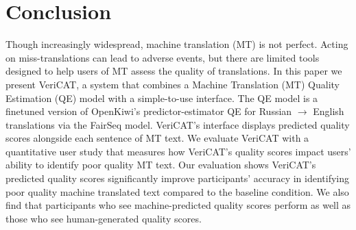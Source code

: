 \section{Conclusion}

Though increasingly widespread, machine translation (MT) is not perfect. Acting on miss-translations can lead to adverse events, but there are limited tools designed to help users of MT assess the quality of translations. In this paper we present VeriCAT, a system %
that combines a Machine Translation (MT) Quality Estimation (QE) model with a simple-to-use interface. The QE model is a finetuned version of OpenKiwi's predictor-estimator QE for Russian $\rightarrow$ English translations via the FairSeq model. VeriCAT's interface displays predicted quality scores alongside each sentence of MT text. We evaluate VeriCAT with a quantitative user study that measures how VeriCAT's quality scores impact users’ ability to identify poor quality MT text. Our evaluation shows VeriCAT's predicted quality scores significantly improve participants' accuracy in identifying poor quality machine translated text compared to the baseline condition. We also find that participants who see machine-predicted quality scores perform as well as those who see human-generated quality scores. 

